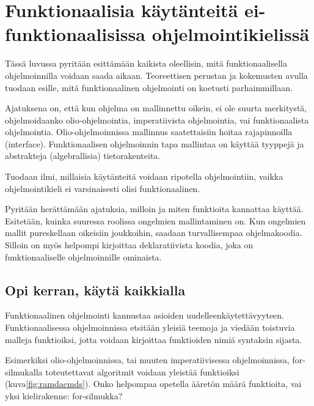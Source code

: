 \vspace{21.5pt}
\chapter{Funktionaalisia käytänteitä ei-funktionaalisissa ohjelmointikielissä}

Tässä luvussa pyritään esittämään kaikista oleellisin, mitä funktionaalisella ohjelmoinnilla voidaan saada aikaan. Teoreettisen perustan ja kokemusten avulla tuodaan esille, mitä funktionaalinen ohjelmointi on koetusti parhaimmillaan.

Ajatuksena on, että kun ohjelma on mallinnettu oikein, ei ole suurta merkitystä, ohjelmoidaanko olio-ohjelmointia, imperatiivista ohjelmointia, vai funktionaalista ohjelmointia. Olio-ohjelmoinnissa mallinnus saatettaisiin hoitaa rajapinnoilla (interface). Funktionaalisen ohjelmoinnin tapa mallintaa on käyttää tyyppejä ja abstrakteja (algebrallisia) tietorakenteita.

Tuodaan ilmi, millaisia käytänteitä voidaan ripotella ohjelmointiin, vaikka ohjelmointikieli ei varsinaisesti olisi funktionaalinen.

Pyritään herättämään ajatuksia, milloin ja miten funktioita kannattaa käyttää. Esitetään, kuinka suuressa roolissa ongelmien mallintaminen on. Kun ongelmien mallit pureskellaan oikeisiin joukkoihin, saadaan turvallisempaa ohjelmakoodia. Silloin on myös helpompi kirjoittaa deklaratiivista koodia, joka on funktionaaliselle ohjelmoinnille ominaista.



\section{Opi kerran, käytä kaikkialla}

Funktionaalinen ohjelmointi kannustaa asioiden uudelleenkäytettävyyteen. Funktionaalisessa ohjelmoinnissa etsitään yleisiä teemoja ja viedään toistuvia malleja funktioiksi, jotta voidaan kirjoittaa funktioiden nimiä syntaksin sijasta.


Esimerkiksi olio-ohjelmoinnissa, tai muuten imperatiivisessa ohjelmoinnissa, for-silmukalla toteutettavat algoritmit voidaan yleistää funktioiksi (kuva\ref{fig:ramdacmds}). Onko helpompaa opetella ääretön määrä funktioita, vai yksi kielirakenne: for-silmukka?


